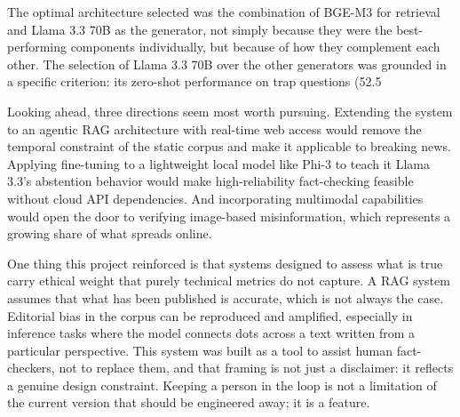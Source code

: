 The optimal architecture selected was the combination of BGE-M3 for retrieval and Llama 3.3 70B as the generator, not simply because they were the best-performing components individually, but because of how they complement each other. The selection of Llama 3.3 70B over the other generators was grounded in a specific criterion: its zero-shot performance on trap questions (52.5%

Looking ahead, three directions seem most worth pursuing. Extending the system to an agentic RAG architecture with real-time web access would remove the temporal constraint of the static corpus and make it applicable to breaking news. Applying fine-tuning to a lightweight local model like Phi-3 to teach it Llama 3.3's abstention behavior would make high-reliability fact-checking feasible without cloud API dependencies. And incorporating multimodal capabilities would open the door to verifying image-based misinformation, which represents a growing share of what spreads online.

One thing this project reinforced is that systems designed to assess what is true carry ethical weight that purely technical metrics do not capture. A RAG system assumes that what has been published is accurate, which is not always the case. Editorial bias in the corpus can be reproduced and amplified, especially in inference tasks where the model connects dots across a text written from a particular perspective. This system was built as a tool to assist human fact-checkers, not to replace them, and that framing is not just a disclaimer: it reflects a genuine design constraint. Keeping a person in the loop is not a limitation of the current version that should be engineered away; it is a feature.
